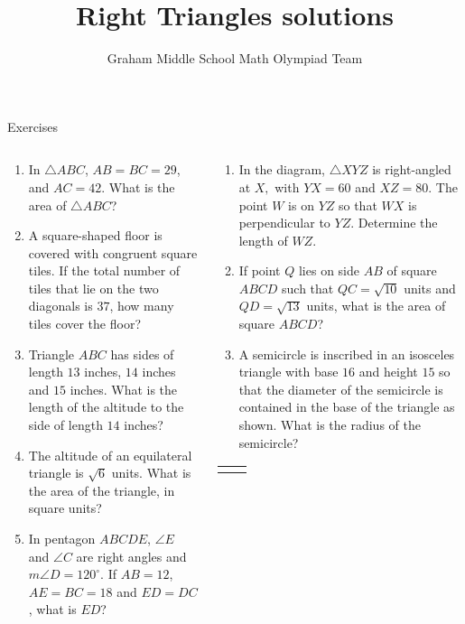 \documentclass[9pt,aspectratio=169]{beamer}
\title{Right Triangles solutions}
\subtitle[Graham Middle School]{Graham Middle School Math Olympiad Team}
\begin{document}
\maketitle

\begin{frame}{Exercises}
  \begin{columns}[T]
    \begin{column}{0.5\textwidth}
      \begin{enumerate}
        \item In $\triangle ABC$, $AB=BC=29$, and $AC=42$. What is the area of $\triangle ABC$? %
        \item A square-shaped floor is covered with congruent square tiles. If the total number of tiles that lie on the two diagonals is $37$, how many tiles cover the floor? %
        \item Triangle $ABC$ has sides of length $13$ inches, $14$ inches and $15$ inches. What is the length of the altitude to the side of length $14$ inches?
        \item The altitude of an equilateral triangle is $\sqrt6$ units. What is the area of the triangle, in square units?
        \item In pentagon $ABCDE$, $\angle E$ and $\angle C$ are right angles and $m\angle D = 120^\circ$. If $AB = 12$, $AE = BC = 18$ and $ED = DC$, what is $ED$? 
        \seti
      \end{enumerate}
    \end{column}
    \begin{column}{0.5\textwidth}
      \begin{enumerate}
        \conti
        \item In the diagram, $\triangle XYZ$ is right-angled at $X,$ with $YX=60$ and $XZ=80.$ The point $W$ is on $YZ$ so that $WX$ is perpendicular to $YZ.$ Determine the length of $WZ.$        
        \item If point $Q$ lies on side $AB$ of square $ABCD$ such that $QC = \sqrt{10}$ units and $QD = \sqrt{13}$ units, what is the area of square $ABCD$?
        \item A semicircle is inscribed in an isosceles triangle with base $16$ and height $15$ so that the diameter of the semicircle is contained in the base of the triangle as shown. What is the radius of the semicircle? 
      \end{enumerate}
      \begin{tabular}{cc}
        \begin{mplibcode}

\end{mplibcode}
\end{tabular}
\end{column}
\end{columns}
\end{frame}
\end{document}
